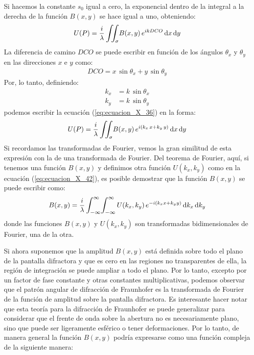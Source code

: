 \documentclass[14pt]{extarticle}
\def\scaleiint#1{\vcenter{\hbox{\scaleto[6ex]{\displaystyle\iint}{#1}}}}
\def\bs{\mkern-12mu}
\begin{document}
Si hacemos la constante $s_{0}$ igual a cero, la exponencial dentro de la integral a la derecha de la función $B (x, y)$ se hace igual a uno, obteniendo:
\begin{align}
U (P) = \dfrac{i}{\lambda} \, \scaleiint{6ex}_{\bs \sigma} B (x, y) \, e^{i k DCO} \dd{x} \dd{y}
\label{eq:ecuacion_X_38}
\end{align}
La diferencia de camino $DCO$ se puede escribir en función de los ángulos $\theta_{x}$ y $\theta_{y}$ en las direcciones $x$ e $y$ como:
\begin{align}
DCO = x \, \sin \theta_{x} + y \, \sin \theta_{y}
\label{eq:ecuacion_X_39}
\end{align}
Por, lo tanto, definiendo:
\begin{eqnarray}
k_{x} &= k \, \sin \theta_{x} \label{eq:ecuacion_X_40} \\[0.5em]
k_{y} &= k \, \sin \theta_{y} \label{eq:ecuacion_X_41}
\end{eqnarray}
podemos escribir la ecuación (\ref{eq:ecuacion_X_36}) en la forma:
\begin{align}
U (P) = \dfrac{i}{\lambda} \, \scaleiint{6ex}_{\bs \sigma} B (x, y) \, e^{i (k_{x} \, x + k_{y} \, y)} \dd{x} \dd{y}
\label{eq:ecuacion_X_42}
\end{align}
Si recordamos las transformadas de Fourier, vemos la gran similitud de esta expresión con la de una transformada de Fourier. Del teorema de Fourier, aquí, si tenemos una función $B (x, y)$ y definimos otra función $U (k_{x}, k_{y})$ como en la ecuación (\ref{eq:ecuacion_X_42}), es posible demostrar que la función $B (x, y)$ se puede escribir como:
\begin{align}
B (x, y) = \dfrac{i}{\lambda} \, \scaleto{\displaystyle\int_{-\infty}^{\infty}}{6ex} \scaleto{\displaystyle\int_{-\infty}^{\infty}}{6ex} \, U (k_{x}, k_{y}) \, e^{-i (k_{x} x + k_{y} y)} \dd{k_{x}} \dd{k_{y}}
\label{eq:ecuacion_X_43}
\end{align}
donde las funciones $B (x, y)$ y $U (k_{x}, k_{y})$ son transformadas bidimensionales de Fourier, una de la otra.
\par
Si ahora suponemos que la amplitud $B (x, y)$ está definida sobre todo el plano de la pantalla difractora y que es cero en las regiones no transparentes de ella, la región de integración se puede ampliar a todo el plano. Por lo tanto, excepto por un factor de fase constante y otras constantes multiplicativas, podemos observar que el patrón angular de difracción de Fraunhofer es la transformada de Fourier de la función de amplitud sobre la pantalla difractora. Es interesante hacer notar que esta teoría para la difracción de Fraunhofer se puede generalizar para considerar que el frente de onda sobre la abertura no es necesariamente plano, sino que puede ser ligeramente esférico o tener deformaciones. Por lo tanto, de manera general la función $B (x, y)$ podría expresarse como una función compleja de la siguiente manera:
\end{document}

